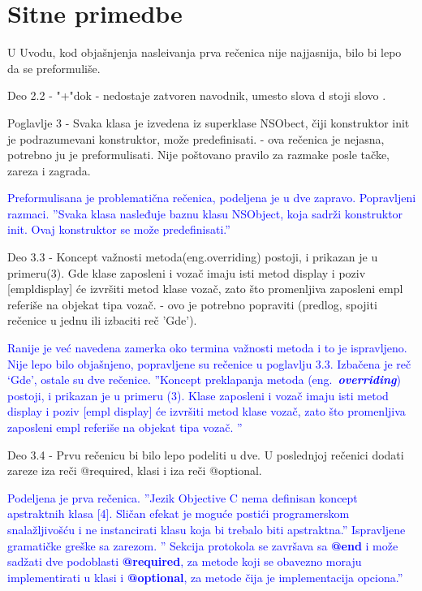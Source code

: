 \documentclass[a4paper]{report}
\newcommand{\odgovor}[1]{\textcolor{blue}{#1}}
\begin{document}
\section{Sitne primedbe}
U Uvodu, kod obja\v snjenja nasle\dj{}ivanja prva re\v cenica nije najjasnija, bilo bi lepo da se preformuli\v se.

Deo 2.2 - "+"dok - nedostaje zatvoren navodnik, umesto slova d stoji slovo \dj{}.

Poglavlje 3 - Svaka klasa je izvedena iz superklase NSObect, \v ciji konstruktor init je podrazumevani konstruktor, mo\v ze predefinisati. - ova re\v cenica je nejasna, potrebno ju je preformulisati. Nije po\v stovano pravilo za razmake posle ta\v cke, zareza i zagrada.

\odgovor{
Preformulisana je problematična rečenica, podeljena je u dve zapravo. Popravljeni razmaci.
''Svaka klasa nasleđuje baznu klasu NSObject, koja sadrži konstruktor init. Ovaj konstruktor se može predefinisati.''
}

Deo 3.3 - Koncept va\v znosti metoda(eng.overriding) postoji, i prikazan je u primeru(3). Gde klase zaposleni i voza\v c imaju isti metod display i poziv [empldisplay] \'ce izvr\v siti metod klase voza\v c, zato \v sto promenljiva zaposleni empl referi\v se na objekat tipa voza\v c. - ovo je potrebno popraviti (predlog, spojiti re\v cenice u jednu ili izbaciti re\v c 'Gde').

\odgovor{
Ranije je već navedena zamerka oko termina važnosti metoda i to je ispravljeno. Nije lepo bilo objašnjeno, popravljene su rečenice u poglavlju 3.3. Izbačena je reč `Gde', ostale su dve rečenice. ''Koncept preklapanja metoda (eng.~\textbf{\em overriding})  postoji, i prikazan je u primeru (3). Klase zaposleni i vozač imaju isti metod display i poziv [empl display] će izvršiti metod klase vozač, zato što promenljiva zaposleni empl referiše na objekat tipa vozač. ''
}

Deo 3.4 - Prvu re\v cenicu bi bilo lepo podeliti u dve. U poslednjoj re\v cenici dodati zareze iza re\v ci @required, klasi i iza re\v ci @optional.

\odgovor{
Podeljena je prva rečenica.
''Jezik Objective C nema definisan koncept apstraktnih klasa [4]. Sličan efekat je moguće postići programerskom snalažljivošću i ne instancirati klasu koja bi trebalo biti apstraktna.''
Ispravljene gramatičke greške sa zarezom.
'' Sekcija protokola se završava sa \textbf{@end} i može sadžati dve podoblasti \textbf{@required}, za metode koji se obavezno moraju implementirati u klasi i \textbf{@optional}, za metode čija je implementacija opciona.''
}
\end{document}

